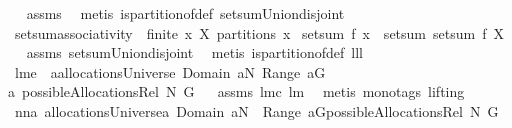 \begin{isabellebody}
\isadelimproof
\ %
\endisadelimproof
%
\isatagproof
{}\isamarkupfalse%
\ assms\ \isamarkupfalse%
\ {\isacharparenleft}metis\ is{\isacharunderscore}partition{\isacharunderscore}of{\isacharunderscore}def\ setsum{\isacharunderscore}Union{\isacharunderscore}disjoint{\isacharunderscore}{}{\isacharparenright}%
\endisatagproof
{\isafoldproof}%
%
\isadelimproof
%
\endisadelimproof
\isanewline
\isanewline
{}\isamarkupfalse%
\ setsum{\isacharunderscore}associativity{\isacharcolon}\ \ {\isachardoublequoteopen}finite\ x{\isachardoublequoteclose}\ {\isachardoublequoteopen}X\ partitions\ x{\isachardoublequoteclose}\ \isanewline
{\isachardoublequoteopen}setsum\ f\ x\ {\isacharequal}\ setsum\ {\isacharparenleft}setsum\ f{\isacharparenright}\ X{\isachardoublequoteclose}%
\isadelimproof
\ %
\endisadelimproof
%
\isatagproof
{}\isamarkupfalse%
\ assms\ setsum{\isacharunderscore}Union{\isacharunderscore}disjoint{\isacharunderscore}{}\ \isamarkupfalse%
\ {\isacharparenleft}metis\ is{\isacharunderscore}partition{\isacharunderscore}of{\isacharunderscore}def\ lll{}{}{\isacharparenright}%
\endisatagproof
{\isafoldproof}%
%
\isadelimproof
%
\endisadelimproof
\isanewline
\isanewline
{}\isamarkupfalse%
\ lm{}{}e{\isacharcolon}\ \ {\isachardoublequoteopen}a{\isasymin}allocationsUniverse{\isachardoublequoteclose}\ {\isachardoublequoteopen}Domain\ a{\isasymsubseteq}N{\isachardoublequoteclose}\ {\isachardoublequoteopen}{\isasymUnion}Range\ a{\isacharequal}G{\isachardoublequoteclose}\ \ \isanewline
{\isachardoublequoteopen}a\ {\isasymin}possibleAllocationsRel\ N\ G{\isachardoublequoteclose}%
\isadelimproof
\ %
\endisadelimproof
%
\isatagproof
{}\isamarkupfalse%
\ assms\ lm{}{}c\ lm{}{}\ \isamarkupfalse%
\ {\isacharparenleft}metis\ {\isacharparenleft}mono{\isacharunderscore}tags{\isacharcomma}\ lifting{\isacharparenright}{\isacharparenright}%
\endisatagproof
{\isafoldproof}%
%
\isadelimproof
%
\endisadelimproof
\isanewline
\isanewline
{}\isamarkupfalse%
\ nn{}{}a{\isacharcolon}\ {\isachardoublequoteopen}{\isacharparenleft}allocationsUniverse{\isasyminter}{\isacharbraceleft}a{\isachardot}\ Domain\ a{\isasymsubseteq}N\ {\isacharampersand}\ {\isasymUnion}Range\ a{\isacharequal}G{\isacharbraceright}{\isacharparenright}{\isasymsubseteq}possibleAllocationsRel\ N\ G{\isachardoublequoteclose}\isanewline

\end{isabellebody}
